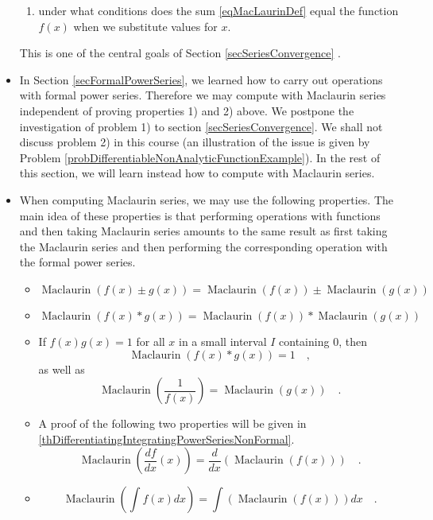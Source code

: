 \documentclass[12pt]{book}
\DeclareMathOperator{\maclaurin}{Maclaurin}
\begin{document}
\begin{itemize}
\begin{enumerate}
\item under what conditions does the sum \eqref{eqMacLaurinDef} equal the function $f(x)$ when we substitute values for $x$. 
\end{enumerate}
This is one of the central goals of Section \ref{secSeriesConvergence} .
\item In Section \ref{secFormalPowerSeries}, we learned how to carry out operations with formal power series. Therefore we may compute with Maclaurin series independent of proving properties 1) and 2) above. We postpone the investigation of problem 1)  to section \ref{secSeriesConvergence}. We shall not discuss problem 2) in this course (an illustration of the issue is given by Problem \ref{probDifferentiableNonAnalyticFunctionExample}). In the rest of this section, we will learn instead how to compute with Maclaurin series. 
\item When computing Maclaurin series, we may use the following properties. The main idea of these properties is that performing operations with functions and then taking Maclaurin series amounts to the same result as first taking the Maclaurin series and then performing the corresponding operation with the formal power series. 
\begin{itemize}
\item 
\[
\maclaurin (f(x)\pm g(x))= \maclaurin (f(x))\pm \maclaurin(g(x))
\]
\item 
\[
\maclaurin (f(x)* g(x))= \maclaurin (f(x))* \maclaurin(g(x))
\]
\item If $f(x)g(x)=1$ for all $x$ in a small interval $I$ containing $0$, then 
\[
\maclaurin (f(x)*g(x))= 1\quad, 
\]
as well as
\[
\maclaurin\left(\frac{1}{f(x)}\right)= \maclaurin(g(x))\quad .
\]
\item A proof of the following two properties will be given in \ref{thDifferentiatingIntegratingPowerSeriesNonFormal}.
\[
\maclaurin \left(\frac{df}{dx}(x)\right)= \frac{d}{dx}\left(\maclaurin(f(x)) \right)\quad .
\]
\item 
\[
\maclaurin \left(\int f(x)dx \right) = \int\left( \maclaurin(f(x))\right)dx \quad .
\]
\end{itemize}
\end{itemize}
\end{document}
